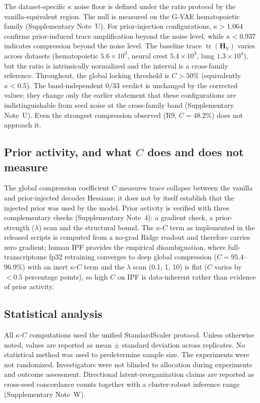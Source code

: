 The dataset-specific $\kappa$ noise floor is defined under the ratio protocol by the vanilla-equivalent region. The null is measured on the G-VAE hematopoietic family (Supplementary Note~U).
For prior-injection configurations, $\kappa>1.064$ confirms prior-induced trace amplification beyond the noise level, while $\kappa<0.937$ indicates compression beyond the noise level. The baseline trace $\operatorname{tr}(\mathbf{H}_V)$ varies across datasets (hematopoietic $5.6\times10^3$, neural crest $5.4\times10^3$, lung $1.3\times10^4$), but the ratio is intrinsically normalized and the interval is a cross-family reference.
Throughout, the global locking threshold is $C>50\%$ (equivalently $\kappa<0.5$). The band-independent $0/33$ verdict is unchanged by the corrected values; they change only the earlier statement that these configurations are indistinguishable from seed noise at the cross-family band (Supplementary Note~U). Even the strongest compression observed (R9, $C=48.2\%$) does not approach it.

\subsection*{Prior activity, and what $C$ does and does not measure}

The global compression coefficient $C$ measures trace collapse between the vanilla and prior-injected decoder Hessians; it does not by itself establish that the injected prior was used by the model. Prior activity is verified with three complementary checks (Supplementary Note~4): a gradient check, a prior-strength ($\lambda$) scan and the structural bound. The $\kappa$-$C$ term as implemented in the released scripts is computed from a no-grad Ridge readout and therefore carries zero gradient; human IPF provides the empirical disambiguation, where full-transcriptome fp32 retraining converges to deep global compression ($C=95.4$--$96.9\%$) with an inert $\kappa$-$C$ term and the $\lambda$ scan (0.1, 1, 10) is flat ($C$ varies by $<0.5$ percentage points), so high $C$ on IPF is data-inherent rather than evidence of prior activity.

\subsection*{Statistical analysis}

All $\kappa$-$C$ computations used the unified StandardScaler protocol. Unless otherwise noted, values are reported as mean $\pm$ standard deviation across replicates. No statistical method was used to predetermine sample size. The experiments were not randomized. Investigators were not blinded to allocation during experiments and outcome assessment. Directional latent-reorganization claims are reported as cross-seed concordance counts together with a cluster-robust inference range (Supplementary Note~W).
